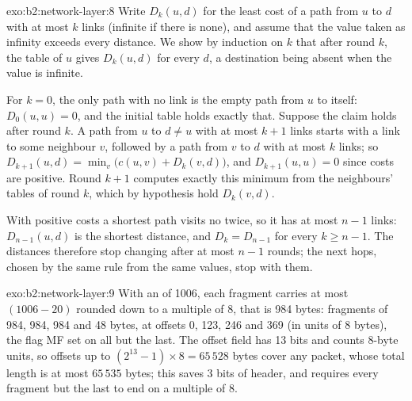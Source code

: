 \begin{solution}{exo:b2:network-layer:8}
Write $D_k(u, d)$ for the least cost of a path from $u$ to $d$ with at most $k$ links (infinite if there is none), and
assume that the value taken as infinity exceeds every distance. We show by induction on $k$ that after round $k$, the
table of $u$ gives $D_k(u, d)$ for every $d$, a destination being absent when the value is infinite.

For $k = 0$, the only path with no link is the empty path from $u$ to itself: $D_0(u, u) = 0$, and the initial table
holds exactly that. Suppose the claim holds after round $k$. A path from $u$ to $d \ne u$ with at most $k + 1$ links
starts with a link to some neighbour $v$, followed by a path from $v$ to $d$ with at most $k$ links; so
$D_{k+1}(u, d) = \min_v \bigl(c(u, v) + D_k(v, d)\bigr)$, and $D_{k+1}(u, u) = 0$ since costs are positive. Round $k +
1$ computes exactly this minimum from the neighbours' tables of round $k$, which by hypothesis hold $D_k(v, d)$.

With positive costs a shortest path visits no  twice, so it has at most $n - 1$ links: $D_{n-1}(u, d)$ is the
shortest distance, and $D_k = D_{n-1}$ for every $k \ge n - 1$. The distances therefore stop changing after at most
$n - 1$ rounds; the next hops, chosen by the same rule from the same values, stop with them.
\end{solution}

\begin{solution}{exo:b2:network-layer:9}
With an  of 1006, each fragment carries at most $(1006 - 20)$ rounded down to a multiple of 8, that is 984 bytes:
fragments of 984, 984, 984 and 48 bytes, at offsets 0, 123, 246 and 369 (in units of 8 bytes), the flag MF set on all
but the last. The offset field has 13 bits and counts 8-byte units, so offsets up to $(2^{13} - 1) \times 8 =
65\,528$ bytes cover any packet, whose total length is at most $65\,535$ bytes; this saves 3 bits of header, and requires every fragment but the last to end on a multiple of 8.
\end{solution}

